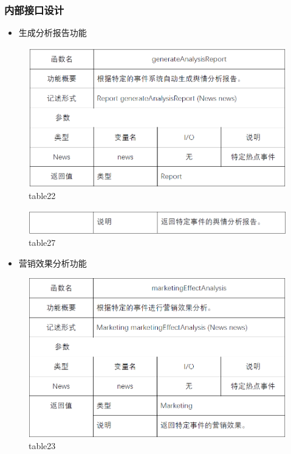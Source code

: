 \subsubsection{内部接口设计}
\begin{itemize}
	\item 生成分析报告功能
\end{itemize}
\begin{figure}[!htbp]
	\centering
	\includegraphics[scale=0.7]{image/b22.png} %
	\caption{table22} %
\end{figure}
\begin{figure}[!htbp]
	\centering
	\includegraphics[scale=0.7]{image/b27.png} %
	\caption{table27} %
\end{figure}
\begin{itemize}
	\item 营销效果分析功能
\end{itemize}
\begin{figure}[!htbp]
	\centering
	\includegraphics[scale=0.7]{image/b23.png} %
	\caption{table23} %
\end{figure}
